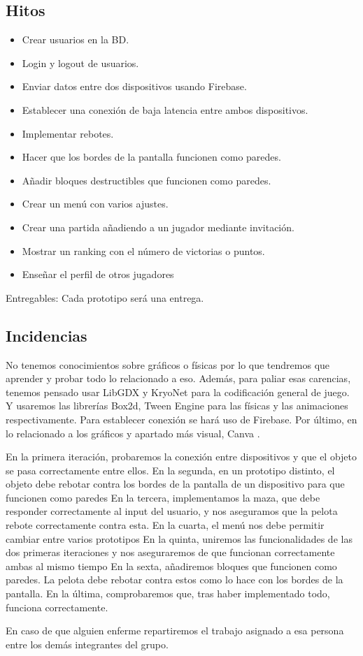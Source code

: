 \documentclass[a4paper,openright,12pt]{article}
\begin{document}
\subsection{Hitos}
\begin{itemize}
\item Crear usuarios en la BD.
\item Login y logout de usuarios.
\item Enviar datos entre dos dispositivos usando Firebase.
\item Establecer una conexión de baja latencia entre ambos dispositivos.
\item Implementar rebotes.
\item Hacer que los bordes de la pantalla funcionen como paredes.
\item Añadir bloques destructibles que funcionen como paredes.
\item Crear un menú con varios ajustes.
\item Crear una partida añadiendo a un jugador mediante invitación.
\item Mostrar un ranking con el número de victorias o puntos.
\item Enseñar el perfil de otros jugadores
\end{itemize}

Entregables:
Cada prototipo será una entrega.

\subsection{Incidencias}
No tenemos conocimientos sobre gráficos o físicas por lo que tendremos que aprender y probar todo lo relacionado a eso. Además, para paliar esas carencias, tenemos pensado usar LibGDX\cite{misc-libGDX} y KryoNet\cite{misc-kryonet} para la codificación general de juego. Y usaremos las librerías Box2d\cite{misc-box2d}, Tween Engine\cite{misc-tween} para las físicas y las animaciones respectivamente. Para establecer conexión se hará uso de Firebase\cite{misc-firebase}. Por último, en lo relacionado a los gráficos y apartado más visual, Canva \cite{misc-canva}.
\par
En la primera iteración, probaremos la conexión entre dispositivos y que el objeto se pasa correctamente entre ellos.
En la segunda, en un prototipo distinto, el objeto debe rebotar contra los bordes de la pantalla de un dispositivo para que funcionen como paredes
En la tercera, implementamos la maza, que debe responder correctamente al input del usuario, y nos aseguramos que la pelota rebote correctamente contra esta.
En la cuarta, el menú nos debe permitir cambiar entre varios prototipos
En la quinta, uniremos las funcionalidades de las dos primeras iteraciones y nos aseguraremos de que funcionan correctamente ambas al mismo tiempo
En la sexta, añadiremos bloques que funcionen como paredes. La pelota debe rebotar contra estos como lo hace con los bordes de la pantalla.
En la última, comprobaremos que, tras haber implementado todo, funciona correctamente.
\par
En caso de que alguien enferme repartiremos el trabajo asignado a esa persona entre los demás integrantes del grupo.
\end{document}
